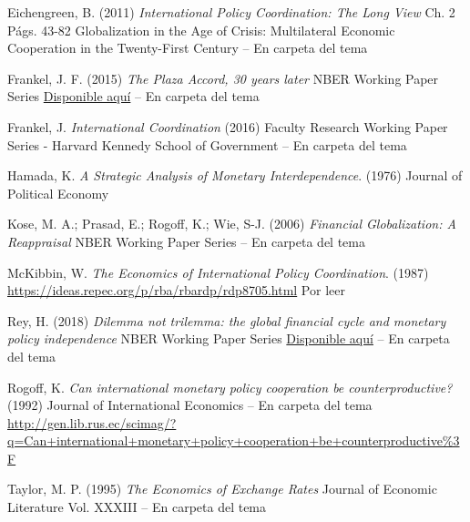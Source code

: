 \documentclass{nuevotema}
\begin{document}
Eichengreen, B. (2011) \textit{International Policy Coordination: The Long View} Ch. 2 Págs. 43-82 Globalization in the Age of Crisis: Multilateral Economic Cooperation in the Twenty-First Century -- En carpeta del tema

Frankel, J. F. (2015) \textit{The Plaza Accord, 30 years later} NBER Working Paper Series \href{https://www.nber.org/papers/w21813.pdf}{Disponible aquí} -- En carpeta del tema

Frankel, J. \textit{International Coordination} (2016) Faculty Research Working Paper Series - Harvard Kennedy School of Government -- En carpeta del tema


Hamada, K.  \textit{A Strategic Analysis of Monetary Interdependence}. (1976) Journal of Political Economy 

Kose, M. A.; Prasad, E.; Rogoff, K.; Wie, S-J. (2006) \textit{Financial Globalization: A Reappraisal} NBER Working Paper Series -- En carpeta del tema

McKibbin, W. \textit{The Economics of International Policy Coordination}. (1987) \url{https://ideas.repec.org/p/rba/rbardp/rdp8705.html} Por leer

Rey, H. (2018) \textit{Dilemma not trilemma: the global financial cycle and monetary policy independence} NBER Working Paper Series \href{https://www.nber.org/papers/w21162.pdf}{Disponible aquí} -- En carpeta del tema

Rogoff, K. \textit{Can international monetary policy cooperation be counterproductive?} (1992) Journal of International Economics -- En carpeta del tema \url{http://gen.lib.rus.ec/scimag/?q=Can+international+monetary+policy+cooperation+be+counterproductive%3F}
	
Taylor, M. P. (1995) \textit{The Economics of Exchange Rates} Journal of Economic Literature Vol. XXXIII -- En carpeta del tema
\end{document}
